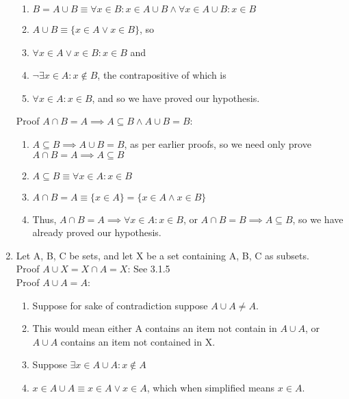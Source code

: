 \documentclass{article}
\begin{document}
\begin{enumerate}
\begin{enumerate}
                \item $B = A \cup B \equiv \forall x \in B: x \in A \cup B
                    \land \forall x \in A \cup B : x \in B$
                \item $A \cup B \equiv \{x \in A \lor x \in B\}$, so
                \item $\forall x \in A \lor x \in B : x \in B$ and
                \item $\neg\exists x \in A : x \notin B$, the contrapositive of which is
                \item $\forall x \in A : x \in B$, and so we have proved our hypothesis.
            \end{enumerate}
            Proof $A \cap B = A \implies A \subseteq B \land A \cup B = B$:
            \begin{enumerate}
                \item $A \subseteq B \implies A \cup B = B$, as per earlier
                    proofs, so we need only prove $A \cap B = A \implies A
                    \subseteq B$
                \item $A \subseteq B \equiv \forall x \in A: x \in B$
                \item $A \cap B = A \equiv \{x \in A\} = \{x \in A \land x \in B\}$
                \item Thus, $A \cap B = A \implies \forall x \in A: x \in B$, or
                    $A \cap B = B \implies A \subseteq B$, so we have already proved our
                    hypothesis.
            \end{enumerate}
        \item Let A, B, C be sets, and let X be a set containing A, B, C as subsets. \\
            Proof $A \cup X = X \cap A = X$: See 3.1.5 \\
            Proof $A \cup A = A$:
            \begin{enumerate}
                \item Suppose for sake of contradiction suppose $A \cup A \neq A$.
                \item This would mean either A contains an item not contain in $A \cup A$, or
                    $A \cup A$ contains an item not contained in X.
                \item Suppose $\exists x \in A \cup A : x \notin A$
                \item $x \in A \cup A \equiv x \in A \lor x \in A$, which when
                    simplified means $x \in A$.

\end{enumerate}
\end{enumerate}
\end{document}
